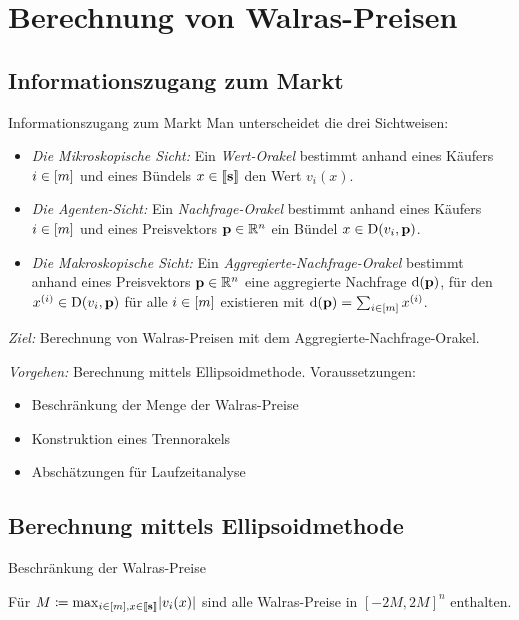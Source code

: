 
\section{Berechnung von Walras-Preisen}
\subsection{Informationszugang zum Markt}
\begin{frame}{Informationszugang zum Markt}
	Man unterscheidet die drei Sichtweisen:
	\begin{itemize}[label=\color{darkblue}$\bullet$]
		\pause\item \emph{Die Mikroskopische Sicht:} Ein \emph{Wert-Orakel} bestimmt anhand eines Käufers $i\in\left[ m \right]$ und eines Bündels $x\in\left\llbracket \mathbf{s} \right\rrbracket$ den Wert $v_i(x)$.
		\pause\item \emph{Die Agenten-Sicht:} Ein \emph{Nachfrage-Orakel} bestimmt anhand eines Käufers $i\in\left[ m \right]$ und eines Preisvektors $\mathbf{p}\in\mathbb{R}^n$ ein Bündel $x\in\operatorname{D}(v_i, \mathbf{p})$.
		\pause\item \emph{Die Makroskopische Sicht:} Ein \emph{Aggregierte-Nachfrage-Orakel} bestimmt anhand eines Preisvektors $\mathbf{p}\in\mathbb{R}^n$ eine aggregierte Nachfrage $\operatorname{d}(\mathbf{p})$, für den $x^{(i)}\in\operatorname{D}(v_i, \mathbf{p})$ für alle $i\in\left[ m \right]$ existieren mit $\operatorname{d}(\mathbf{p}) = \sum_{i\in\left[ m \right]} x^{(i)}$.
	\end{itemize}

\vspace{1em}

\pause
	\parbox{\textwidth}{\emph{Ziel:} Berechnung von Walras-Preisen mit dem Aggregierte-Nachfrage-Orakel.}
	
\vspace{1em}

\pause
	\parbox{\textwidth}{
		\emph{Vorgehen:} Berechnung mittels Ellipsoidmethode. Voraussetzungen:
		\begin{itemize}[label=\color{darkblue}$\bullet$]
			\item Beschränkung der Menge der Walras-Preise
			\item Konstruktion eines Trennorakels
			\item Abschätzungen für Laufzeitanalyse
		\end{itemize}
	}
\end{frame}

\subsection{Berechnung mittels Ellipsoidmethode}
\begin{frame}{Beschränkung der Walras-Preise}
\begin{lemma}
	Für $M\coloneqq \max_{i\in\left[ m \right],x\in\left\llbracket \mathbf{s} \right\rrbracket} \lvert v_i(x)\rvert$ sind alle Walras-Preise in $[-2M, 2M]^n$ enthalten.
\end{lemma}
\end{frame}

